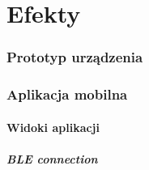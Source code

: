 \part{Efekty}

\section{Prototyp urządzenia}

\section{Aplikacja mobilna}
\subsection{Widoki aplikacji}
\subsubsection{BLE connection}

